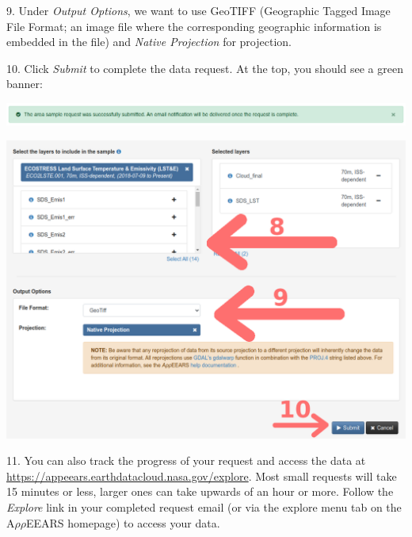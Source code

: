 \documentclass[oneside,a4paper,11pt,explicit]{book}
\begin{document}

9. Under \textit{Output Options}, we want to use GeoTIFF (Geographic Tagged Image File Format; an image file where the corresponding geographic information is embedded in the file) and \textit{Native Projection} for projection.

10. Click \textit{Submit} to complete the data request. At the top, you should see a green banner:

\centerline{\includegraphics[width=\textwidth]{RequestSuccess.png}}

\centerline{\includegraphics[width=\textwidth]{LayerSettings.png}}

11. You can also track the progress of your request and access the data at \url{https://appeears.earthdatacloud.nasa.gov/explore}. Most small requests will take 15 minutes or less, larger ones can take upwards of an hour or more. Follow the \textit{Explore} link in your completed request email (or via the explore menu tab on the A$\rho\rho$EEARS homepage) to access your data.

\end{document}

